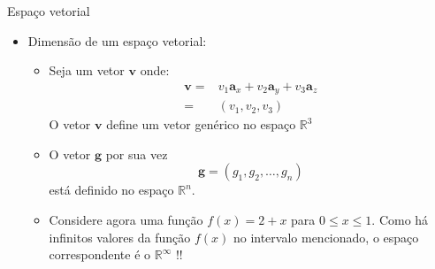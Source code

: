       \begin{slide}[toc=]{Espaço vetorial}
	      \begin{itemize}
		      \item Dimensão de um espaço vetorial:
			      \begin{itemize}
				      \item Seja um vetor $\mathbf v$ onde:
					      \begin{align*}
						      \mathbf v =& v_1\mathbf a_x + v_2 \mathbf a_y + v_3 \mathbf a_z\\
						                =& (v_1, v_2, v_3)
					      \end{align*}
					      O vetor $\mathbf v$ define um vetor genérico no espaço \alert{$\mathbb R^3$}\\
				      \item O vetor $\mathbf g$ por sua vez
					      \begin{equation*}
						      \mathbf g = (g_1, g_2,\dots, g_n)
					      \end{equation*}
					      está definido no espaço \alert{$\mathbb R^n$.}
				      \item Considere agora uma função $f(x) = 2+x$ para $0\leq x \leq 1$. Como há infinitos valores da função $f(x)$ no intervalo mencionado, o espaço correspondente é o \alert{$\mathbb R^\infty$} !!
			       \end{itemize}
	      \end{itemize}
      \end{slide}
      
